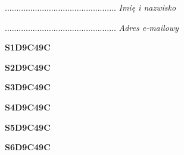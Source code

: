 \begin{turn}{90}\begin{minipage}{\linewidth} \vspace{20mm} ................................................  \textit{Imię i nazwisko}\end{minipage}\end{turn}

\begin{turn}{90}\begin{minipage}{\linewidth} \vspace{20mm} ................................................  \textit{Adres e-mailowy}\end{minipage}\end{turn}

\begin{turn}{90}\huge \begin{minipage}{\linewidth} \vspace{10mm}\textbf{S1D9C49C}\end{minipage}\end{turn}

\begin{turn}{90}\huge \begin{minipage}{\linewidth} \vspace{10mm}\textbf{S2D9C49C}\end{minipage}\end{turn}

\begin{turn}{90}\huge \begin{minipage}{\linewidth} \vspace{10mm}\textbf{S3D9C49C}\end{minipage}\end{turn}

\begin{turn}{90}\huge \begin{minipage}{\linewidth} \vspace{10mm}\textbf{S4D9C49C}\end{minipage}\end{turn}

\begin{turn}{90}\huge \begin{minipage}{\linewidth} \vspace{10mm}\textbf{S5D9C49C}\end{minipage}\end{turn}

\begin{turn}{90}\huge \begin{minipage}{\linewidth} \vspace{10mm}\textbf{S6D9C49C}\end{minipage}\end{turn}

